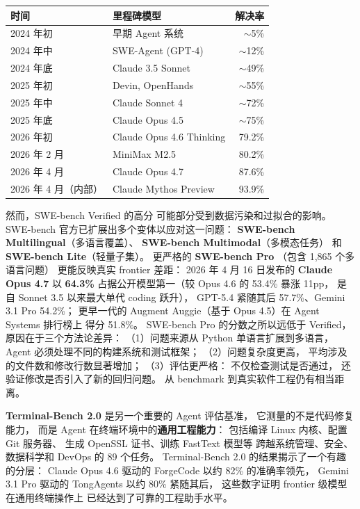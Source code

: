 \begin{center}\small
\renewcommand{\arraystretch}{1.3}
\begin{tabular}{llr}
  \toprule
  \rowcolor{figLightGray}
  \textbf{时间} & \textbf{里程碑模型} & \textbf{解决率} \\
  \midrule
  2024 年初 & 早期 Agent 系统 & $\sim$5\% \\
  2024 年中 & SWE-Agent (GPT-4) & $\sim$12\% \\
  2024 年底 & Claude 3.5 Sonnet & $\sim$49\% \\
  2025 年初 & Devin, OpenHands & $\sim$55\% \\
  2025 年中 & Claude Sonnet 4 & $\sim$72\% \\
  2025 年底 & Claude Opus 4.5 & $\sim$75\% \\
  2026 年初 & Claude Opus 4.6 Thinking & 79.2\% \\
  2026 年 2 月 & MiniMax M2.5 & 80.2\% \\
  2026 年 4 月 & Claude Opus 4.7 & 87.6\% \\
  2026 年 4 月（内部） & Claude Mythos Preview & 93.9\% \\
  \bottomrule
\end{tabular}
\end{center}

然而，SWE-bench Verified 的高分
可能部分受到数据污染和过拟合的影响。
SWE-bench 官方已扩展出多个变体以应对这一问题：
\textbf{SWE-bench Multilingual}（多语言覆盖）、
\textbf{SWE-bench Multimodal}（多模态任务）
和 \textbf{SWE-bench Lite}（轻量子集）。
更严格的 \textbf{SWE-bench Pro}
（包含 1,865 个多语言问题）
更能反映真实 frontier 差距：
2026 年 4 月 16 日发布的 \textbf{Claude Opus 4.7}
以 \textbf{64.3\%} 占据公开模型第一（较 Opus 4.6 的 53.4\% 暴涨 11pp，
是自 Sonnet 3.5 以来最大单代 coding 跃升），
GPT-5.4 紧随其后 57.7\%、Gemini 3.1 Pro 54.2\%；
更早一代的 Augment Auggie（基于 Opus 4.5）在 Agent Systems 排行榜上
得分 51.8\%。
SWE-bench Pro 的分数之所以远低于 Verified，
原因在于三个方法论差异：
（1）问题来源从 Python 单语言扩展到多语言，
Agent 必须处理不同的构建系统和测试框架；
（2）问题复杂度更高，
平均涉及的文件数和修改行数显著增加；
（3）评估更严格：
不仅检查测试是否通过，
还验证修改是否引入了新的回归问题。
从 benchmark 到真实软件工程仍有相当距离。

\textbf{Terminal-Bench 2.0} 是另一个重要的 Agent 评估基准，
它测量的不是代码修复能力，
而是 Agent 在终端环境中的\textbf{通用工程能力}：
包括编译 Linux 内核、配置 Git 服务器、
生成 OpenSSL 证书、训练 FastText 模型等
跨越系统管理、安全、数据科学和 DevOps 的 89 个任务。
Terminal-Bench 2.0 的结果揭示了一个有趣的分层：
Claude Opus 4.6 驱动的 ForgeCode 以约 82\% 的准确率领先，
Gemini 3.1 Pro 驱动的 TongAgents 以约 80\% 紧随其后，
这些数字证明 frontier 级模型在通用终端操作上
已经达到了可靠的工程助手水平。

